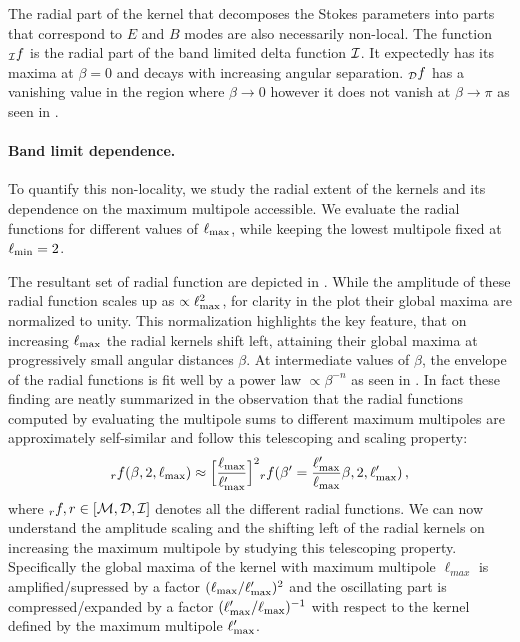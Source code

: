 The radial part of the kernel that decomposes the  Stokes parameters into parts that correspond to $E$ and $B$ modes  are also  necessarily non-local.  The function ${_{\mathcal{I}}f}$ is the radial part of the band limited delta function $\mathcal{I}$.  It expectedly has its maxima at $\beta=0$ and decays with increasing angular separation.  ${_{\mathcal{D}}f}$ has a vanishing value in the region where $\beta \rightarrow 0$ however it does not vanish at $\beta \rightarrow \pi$ as seen in .

\paragraph{Band limit dependence.} 
To quantify this non-locality, we study the radial extent of the kernels and its dependence on the maximum multipole accessible. We evaluate the radial functions for different values of $\ell_{\rm max}$, while keeping the lowest multipole fixed at $\ell_{\rm min}=2$. 

The resultant set of radial function are depicted in . While the amplitude of these radial function scales up as $\propto \ell_{\rm max}^2$, for clarity in the plot their global maxima are normalized to unity.  This normalization highlights the key feature, that on increasing $\ell_{\rm max}$ the radial kernels shift left, attaining their global maxima at progressively small angular distances $\beta$.  At intermediate values of $\beta$, the envelope of the radial functions is fit well by a power law $ \propto \beta^{-n}$ as seen in .
In fact these finding are neatly summarized in the observation that the radial functions computed by evaluating the multipole sums to different maximum multipoles are approximately self-similar and follow this telescoping and scaling property: $${}_rf(\beta,2,\ell_{\rm max}) \approx \Big[\frac{\ell_{\rm max}}{\ell'_{\rm max}}\Big]^2{}_rf(\beta'=\frac{\ell'_{\rm max}}{\ell_{\rm max}} \beta ,2,\ell'_{\rm max}) \,,$$ where ${}_rf , r \in [\mathcal{M}, \mathcal{D},\mathcal{I}]$ denotes all the different radial functions. We can now understand the amplitude scaling and the shifting left of the radial kernels on increasing the maximum multipole by studying this telescoping property. Specifically the global maxima of the kernel with maximum multipole $\ell_{max}$ is amplified/supressed by a factor $(\ell_{\rm max}/\ell'_{\rm max})^2$ and the oscillating part is compressed/expanded by a factor $(\ell'_{\rm max}/\ell_{\rm max})^{-1}$ with respect to the kernel defined by the maximum multipole $\ell'_{\rm max}$.

